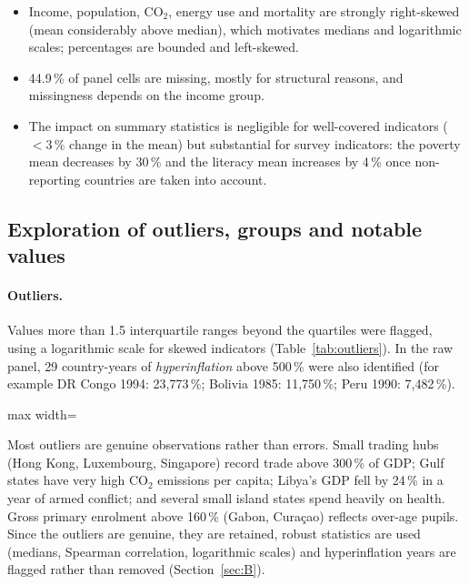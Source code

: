 \documentclass[11pt,a4paper]{article}
\newcommand{\tab}[1]{\begin{adjustbox}{max width=\textwidth}\end{adjustbox}}
\begin{document}
\begin{summary}
\begin{itemize}
\item Income, population, CO$_2$, energy use and mortality are strongly right-skewed (mean considerably above median), which motivates medians and logarithmic scales; percentages are bounded and left-skewed.
\item 44.9\,\% of panel cells are missing, mostly for structural reasons, and missingness depends on the income group.
\item The impact on summary statistics is negligible for well-covered indicators ($<3$\,\% change in the mean) but substantial for survey indicators: the poverty mean decreases by 30\,\% and the literacy mean increases by 4\,\% once non-reporting countries are taken into account.
\end{itemize}
\end{summary}

\subsection{Exploration of outliers, groups and notable values}

\paragraph{Outliers.} Values more than 1.5 interquartile ranges beyond the quartiles were flagged, using a logarithmic scale for skewed indicators (Table~\ref{tab:outliers}). In the raw panel, 29 country-years of \emph{hyperinflation} above 500\,\% were also identified (for example DR Congo 1994: 23,773\,\%; Bolivia 1985: 11,750\,\%; Peru 1990: 7,482\,\%).

\begin{table}[htbp]\centering
\caption{IQR outliers in the snapshot (indicators with at least one outlier).}\label{tab:outliers}
\tab{outliers}
\end{table}

Most outliers are genuine observations rather than errors. Small trading hubs (Hong Kong, Luxembourg, Singapore) record trade above 300\,\% of GDP; Gulf states have very high CO$_2$ emissions per capita; Libya's GDP fell by 24\,\% in a year of armed conflict; and several small island states spend heavily on health. Gross primary enrolment above 160\,\% (Gabon, Curaçao) reflects over-age pupils. Since the outliers are genuine, they are retained, robust statistics are used (medians, Spearman correlation, logarithmic scales) and hyperinflation years are flagged rather than removed (Section~\ref{sec:B}).
\end{document}

